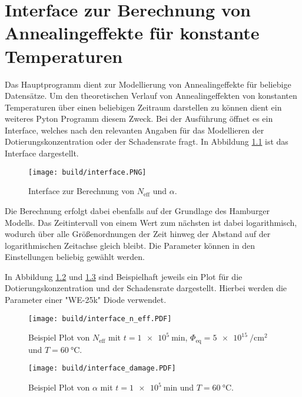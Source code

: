\chapter{Interface zur Berechnung von Annealingeffekte für konstante Temperaturen}
Das Hauptprogramm dient zur Modellierung von Annealingeffekte für beliebige Datensätze.
Um den theoretischen Verlauf von Annealingeffekten von konstanten Temperaturen über einen
beliebigen Zeitraum darstellen zu können dient ein weiteres Pyton Programm diesem Zweck.
Bei der Ausführung öffnet es ein Interface, welches nach den relevanten Angaben für
das Modellieren der Dotierungskonzentration oder der Schadensrate fragt. In Abbildung \ref{fig:interface}
ist das Interface dargestellt.

\begin{figure}
    \texttt{[image: build/interface.PNG]}
\caption{Interface zur Berechnung von $N_{\mathrm{eff}}$ und $\alpha$.}
\label{fig:interface}
\end{figure}

Die Berechnung erfolgt dabei ebenfalls auf der Grundlage des Hamburger Modells.
Das Zeitintervall von einem Wert zum nächsten ist dabei logarithmisch, wodurch über alle
Größenordnungen der Zeit hinweg der Abstand auf der logarithmischen Zeitachse gleich bleibt.
Die Parameter können in den Einstellungen beliebig gewählt werden.

In Abbildung \ref{fig:inter_n} und \ref{fig:inter_damage} sind Beispielhaft jeweils ein Plot für die Dotierungskonzentration und der
Schadensrate dargestellt. Hierbei werden die Parameter einer "WE-25k" Diode verwendet.


\begin{figure}
  \texttt{[image: build/interface\_n\_eff.PDF]}
  \caption{Beispiel Plot von $N_{\mathrm{eff}}$ mit $t = \SI{1e5}{\minute}$, $\Phi_{\mathrm{eq}}= \SI{5e15}{\per\centi\meter\squared}$ und $T=\SI{60}{\celsius}$.}
  \label{fig:inter_n}
\end{figure}

\begin{figure}
  \texttt{[image: build/interface\_damage.PDF]}
  \caption{Beispiel Plot von $\alpha$ mit $t = \SI{1e5}{\minute}$ und $T=\SI{60}{\celsius}$.}
  \label{fig:inter_damage}
\end{figure}
